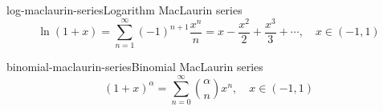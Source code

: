 \documentclass[preview]{standalone}
\begin{document}
\begin{snippetproposition}{log-maclaurin-series}{Logarithm MacLaurin series}
    \[
        \ln(1 + x) = \sum_{n=1}^\infty {(-1)}^{n+1}\frac{x^n}{n}
        = x - \frac{x^2}{2} + \frac{x^3}{3} + \cdots, \quad x\in(-1,1)
    \]
\end{snippetproposition}

\begin{snippetproposition}{binomial-maclaurin-series}{Binomial MacLaurin series}
    \[
        {(1 + x)}^\alpha = \sum_{n=0}^\infty \binom{\alpha}{n}x^n, \quad x\in(-1,1)
    \]
\end{snippetproposition}
\end{document}
